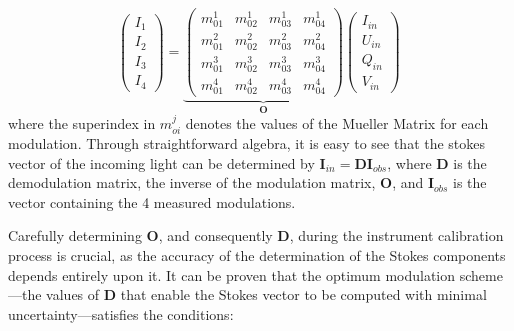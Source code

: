 \begin{equation}
  \begin{pmatrix}
  I _ 1 \\
  I _ 2 \\
  I _ 3 \\
  I _ 4
  \end{pmatrix} = 
  \underbrace{\begin{pmatrix} 
      m ^ 1 _ {01} & m ^ 1 _ {02} & m ^ 1 _ {03} & m ^ 1 _ {04} \\ 
      m ^ 2 _ {01} & m ^ 2 _ {02} & m ^ 2 _ {03} & m ^ 2 _ {04} \\
      m ^ 3 _ {01} & m ^ 3 _ {02} & m ^ 3 _ {03} & m ^ 3 _ {04} \\
      m ^ 4 _ {01} & m ^ 4 _ {02} & m ^ 4 _ {03} & m ^ 4 _ {04} 
  \end{pmatrix}}_ {\textbf{O}}
  \begin{pmatrix}
    I _ {in} \\
    U _ {in} \\
    Q _ {in} \\
    V _ {in}
    \end{pmatrix} \, 
    \label{eq_spectro_theory: stokes_linear_comb}
\end{equation}
where the superindex in $m ^j _{oi}$ denotes the values of the Mueller Matrix for each modulation. Through straightforward algebra, it is easy to see that the stokes vector of the incoming light can be determined by $\textbf{I}_{in} = \textbf{D}\textbf{I}_{obs}$, where $\textbf{D}$ is the demodulation matrix, the inverse of the modulation matrix, $\textbf{O}$, and $\textbf{I}_{obs}$ is the vector containing the 4 measured modulations. 

Carefully determining $\textbf{O}$, and consequently $\textbf{D}$, during the instrument calibration process is crucial, as the accuracy of the determination of the Stokes components depends entirely upon it. It can be proven \citep{optimum_modulation} that the optimum modulation scheme—the values of $\textbf{D}$ that enable the Stokes vector to be computed with minimal uncertainty—satisfies the conditions:

